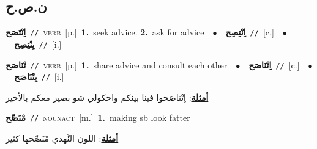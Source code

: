 \documentclass[10pt,a4paper,twoside]{article} %
\begin{document}
\begin{multicols}{2}
\vspace{-3mm}
\subsection*{\color{blue}\foreignlanguage{arabic}{ن.ص.ح}\color{blue}{}} 

{\setlength\topsep{0pt}\textbf{\foreignlanguage{arabic}{اِنْتَصَح}}\ {\color{gray}\texttt{//}\color{black}}\ \textsc{verb}\ [p.]\ \textbf{1.}~seek advice.  \textbf{2.}~ask for advice\ \ $\bullet$\ \ \setlength\topsep{0pt}\textbf{\foreignlanguage{arabic}{اِنْتِصِح}}\ {\color{gray}\texttt{//}\color{black}}\ [c.]\ \ $\bullet$\ \ \setlength\topsep{0pt}\textbf{\foreignlanguage{arabic}{يِنْتِصِح}}\ {\color{gray}\texttt{//}\color{black}}\ [i.]\ } \vspace{2mm}

{\setlength\topsep{0pt}\textbf{\foreignlanguage{arabic}{تْنَاصَح}}\ {\color{gray}\texttt{//}\color{black}}\ \textsc{verb}\ [p.]\ \textbf{1.}~share advice and consult each other\ \ $\bullet$\ \ \setlength\topsep{0pt}\textbf{\foreignlanguage{arabic}{اِتْنَاصَح}}\ {\color{gray}\texttt{//}\color{black}}\ [c.]\ \ $\bullet$\ \ \setlength\topsep{0pt}\textbf{\foreignlanguage{arabic}{يِتْنَاصَح}}\ {\color{gray}\texttt{//}\color{black}}\ [i.]\  \begin{flushright}\color{gray}\foreignlanguage{arabic}{\textbf{\underline{\foreignlanguage{arabic}{أمثلة}}}: اِتْناصَحوا فينا بينكم واحكولي شو بصير معكم بالأخير}\end{flushright}\color{black}} \vspace{2mm}

{\setlength\topsep{0pt}\textbf{\foreignlanguage{arabic}{مْنَصِّح}}\ {\color{gray}\texttt{//}\color{black}}\ \textsc{noun\textunderscore act}\ [m.]\ \textbf{1.}~making sb look fatter\  \begin{flushright}\color{gray}\foreignlanguage{arabic}{\textbf{\underline{\foreignlanguage{arabic}{أمثلة}}}: اللون النَّهدي مْنَصِّحها كثير}\end{flushright}\color{black}} \vspace{2mm}


\end{multicols}
\end{document}
